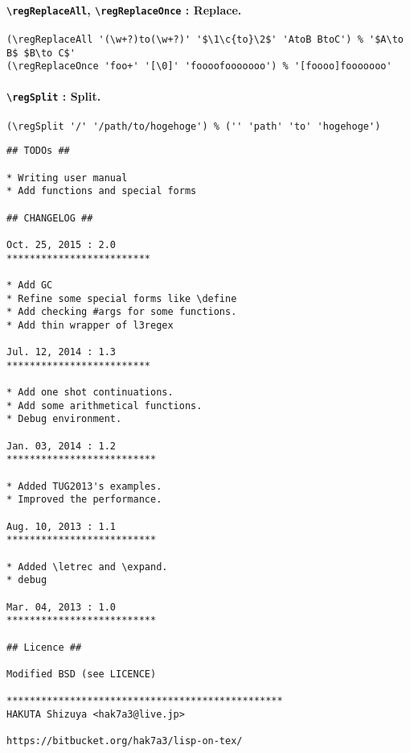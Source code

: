 \documentclass[10pt,a4paper]{article}
\newcommand{\pT}[1]{\textbf{\texttt{\textbackslash #1}}}
\begin{document}
\paragraph{\pT{regReplaceAll}, \pT{regReplaceOnce} : Replace.}
\begin{verbatim}
(\regReplaceAll '(\w+?)to(\w+?)' '$\1\c{to}\2$' 'AtoB BtoC') % '$A\to B$ $B\to C$'
(\regReplaceOnce 'foo+' '[\0]' 'foooofooooooo') % '[foooo]fooooooo'
\end{verbatim}

\paragraph{\pT{regSplit} : Split.}
\begin{verbatim}
(\regSplit '/' '/path/to/hogehoge') % ('' 'path' 'to' 'hogehoge')
\end{verbatim}

\newpage
{}
\begin{verbatim}
## TODOs ##

* Writing user manual
* Add functions and special forms

## CHANGELOG ##

Oct. 25, 2015 : 2.0
*************************

* Add GC
* Refine some special forms like \define
* Add checking #args for some functions.
* Add thin wrapper of l3regex

Jul. 12, 2014 : 1.3
*************************

* Add one shot continuations.
* Add some arithmetical functions.
* Debug environment.

Jan. 03, 2014 : 1.2
**************************

* Added TUG2013's examples.
* Improved the performance.

Aug. 10, 2013 : 1.1
**************************

* Added \letrec and \expand.
* debug

Mar. 04, 2013 : 1.0
**************************

## Licence ##

Modified BSD (see LICENCE)

************************************************
HAKUTA Shizuya <hak7a3@live.jp>

https://bitbucket.org/hak7a3/lisp-on-tex/
\end{verbatim}
\end{document}

